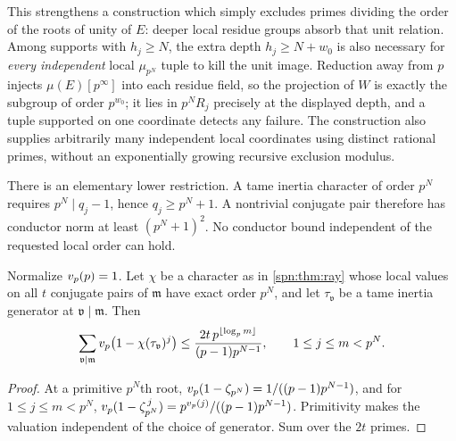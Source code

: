 This strengthens a construction which simply excludes primes dividing the
order of the roots of unity of $E$: deeper local residue groups absorb that
unit relation. Among supports with $h_j\ge N$, the extra depth
$h_j\ge N+w_0$ is also necessary for \emph{every independent} local
$\mu_{p^N}$ tuple to kill the unit image. Reduction away from $p$ injects
$\mu(E)[p^\infty]$ into each residue field, so the projection of $W$ is
exactly the subgroup of order $p^{w_0}$; it lies in $p^NR_j$ precisely at the
displayed depth, and a tuple supported on one coordinate detects any failure.
The construction also supplies arbitrarily many independent local coordinates
using distinct rational primes, without an exponentially growing recursive
exclusion modulus.

There is an elementary lower restriction. A tame inertia character of order
$p^N$ requires $p^N\mid q_j-1$, hence $q_j\ge p^N+1$. A nontrivial conjugate
pair therefore has conductor norm at least $(p^N+1)^2$. No conductor bound
independent of the requested local order can hold.

\begin{lemma}\label{spn:lem:tame-cost}
Normalize $v_p(p)=1$. Let $\chi$ be a character as in \cref{spn:thm:ray}
whose local values on all $t$ conjugate pairs of $\mathfrak m$ have exact
order $p^N$, and let $\tau_{\mathfrak v}$ be a tame inertia generator at
$\mathfrak v\mid\mathfrak m$. Then
\[
 \sum_{\mathfrak v\mid\mathfrak m}v_p\bigl(1-\chi(\tau_{\mathfrak v})^j\bigr)
 \le\frac{2t\,p^{\lfloor\log_pm\rfloor}}{(p-1)p^{N-1}},\qquad1\le j\le m<p^N .
\]
\end{lemma}

\begin{proof}
At a primitive $p^N$th root, $v_p(1-\zeta_{p^N})=1/((p-1)p^{N-1})$, and for
$1\le j\le m<p^N$,
$v_p(1-\zeta_{p^N}^{\,j})=p^{v_p(j)}/((p-1)p^{N-1})$. Primitivity makes the
valuation independent of the choice of generator. Sum over the $2t$ primes.
\end{proof}

